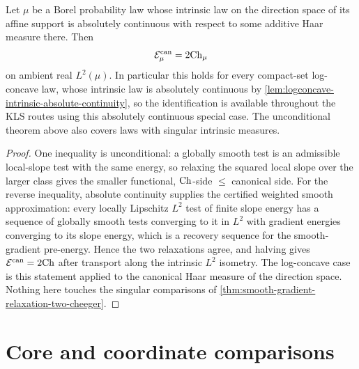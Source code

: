 \begin{corollary}
  \label{cor:absolutely-continuous-relaxation-two-cheeger}
  \leanok
  Let $\mu$ be a Borel probability law whose intrinsic law on the direction space of its affine
  support is absolutely continuous with respect to some additive Haar measure there.  Then
  \[
    \mathcal E^{\mathrm{can}}_\mu=2\mathrm{Ch}_\mu
  \]
  on ambient real $L^2(\mu)$.  In particular this holds for every compact-set log-concave law,
  whose intrinsic law is absolutely continuous by
  \cref{lem:logconcave-intrinsic-absolute-continuity}, so the identification is available
  throughout the KLS routes using this absolutely continuous special case. The unconditional theorem above also covers laws with singular intrinsic measures.
\end{corollary}
\begin{proof}
  \leanok
  One inequality is unconditional: a globally smooth test is an admissible local-slope test with
  the same energy, so relaxing the squared local slope over the larger class gives the smaller
  functional, $\mathrm{Ch}$-side $\le$ canonical side.  For the reverse inequality, absolute continuity
  supplies the certified weighted smooth approximation: every locally Lipschitz $L^2$ test of
  finite slope energy has a sequence of globally smooth tests converging to it in $L^2$ with
  gradient energies converging to its slope energy, which is a recovery sequence for the
  smooth-gradient pre-energy.  Hence the two relaxations agree, and halving gives
  $\mathcal E^{\mathrm{can}}=2\mathrm{Ch}$ after transport along the intrinsic $L^2$ isometry.  The
  log-concave case is this statement applied to the canonical Haar measure of the direction
  space.  Nothing here touches the singular comparisons of
  \cref{thm:smooth-gradient-relaxation-two-cheeger}.
\end{proof}

\section{Core and coordinate comparisons}

